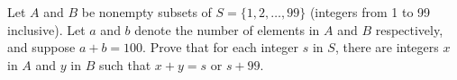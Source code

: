 Let $A$ and $B$ be nonempty subsets of $S = \{1, 2, \dots, 99\}$ (integers from
1 to 99 inclusive). Let $a$ and $b$ denote the number of elements in $A$ and
$B$ respectively, and suppose $a + b = 100$. Prove that for each integer $s$ in
$S$, there are integers $x$ in $A$ and $y$ in $B$ such that $x + y = s$ or
$s + 99$.
